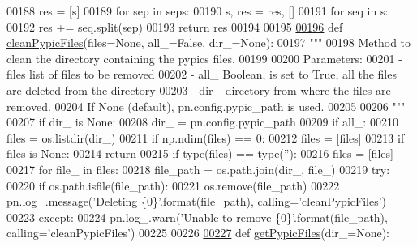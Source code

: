 \begin{DoxyCode}
{{{{00188     res = [s]
00189     \textcolor{keywordflow}{for} sep \textcolor{keywordflow}{in} seps:
00190         s, res = res, []
00191         \textcolor{keywordflow}{for} seq \textcolor{keywordflow}{in} s:
00192             res += seq.split(sep)
00193     \textcolor{keywordflow}{return} res
00194 
00195 
\hypertarget{misc_8py_source_l00196}{}\hyperlink{namespacepyneb_1_1utils_1_1misc_a71fea98dc66e2a1793b5c86a345da052}{00196} \textcolor{keyword}{def }\hyperlink{namespacepyneb_1_1utils_1_1misc_a71fea98dc66e2a1793b5c86a345da052}{cleanPypicFiles}(files=None, all\_=False, dir\_=None):
00197     \textcolor{stringliteral}{"""}
00198 \textcolor{stringliteral}{    Method to clean the directory containing the pypics files.}
00199 \textcolor{stringliteral}{}
00200 \textcolor{stringliteral}{    Parameters:}
00201 \textcolor{stringliteral}{        - files    list of files to be removed}
00202 \textcolor{stringliteral}{        - all\_      Boolean, is set to True, all the files are deleted from the directory}
00203 \textcolor{stringliteral}{        - dir\_      directory from where the files are removed. }
00204 \textcolor{stringliteral}{                If None (default), pn.config.pypic\_path is used.}
00205 \textcolor{stringliteral}{}
00206 \textcolor{stringliteral}{    """}
00207     \textcolor{keywordflow}{if} dir\_ \textcolor{keywordflow}{is} \textcolor{keywordtype}{None}:
00208         dir\_ = pn.config.pypic\_path
00209     \textcolor{keywordflow}{if} all\_:
00210         files = os.listdir(dir\_)
00211         \textcolor{keywordflow}{if} np.ndim(files) == 0:
00212             files = [files]
00213     \textcolor{keywordflow}{if} files \textcolor{keywordflow}{is} \textcolor{keywordtype}{None}:
00214         \textcolor{keywordflow}{return}
00215     \textcolor{keywordflow}{if} type(files) == type(\textcolor{stringliteral}{''}):
00216         files = [files]
00217     \textcolor{keywordflow}{for} file\_ \textcolor{keywordflow}{in} files:
00218         file\_path = os.path.join(dir\_, file\_)
00219         \textcolor{keywordflow}{try}:
00220             \textcolor{keywordflow}{if} os.path.isfile(file\_path):
00221                 os.remove(file\_path)
00222                 pn.log\_.message(\textcolor{stringliteral}{'Deleting \{0\}'}.format(file\_path), calling=\textcolor{stringliteral}{'cleanPypicFiles'})
00223         \textcolor{keywordflow}{except}:
00224             pn.log\_.warn(\textcolor{stringliteral}{'Unable to remove \{0\}'}.format(file\_path), calling=\textcolor{stringliteral}{'cleanPypicFiles'})
00225 
00226 
\hypertarget{misc_8py_source_l00227}{}\hyperlink{namespacepyneb_1_1utils_1_1misc_aee812eafa08b828b4c65c700a6cf4ff6}{00227} \textcolor{keyword}{def }\hyperlink{namespacepyneb_1_1utils_1_1misc_aee812eafa08b828b4c65c700a6cf4ff6}{getPypicFiles}(dir\_=None):
}}}}
\end{DoxyCode}
